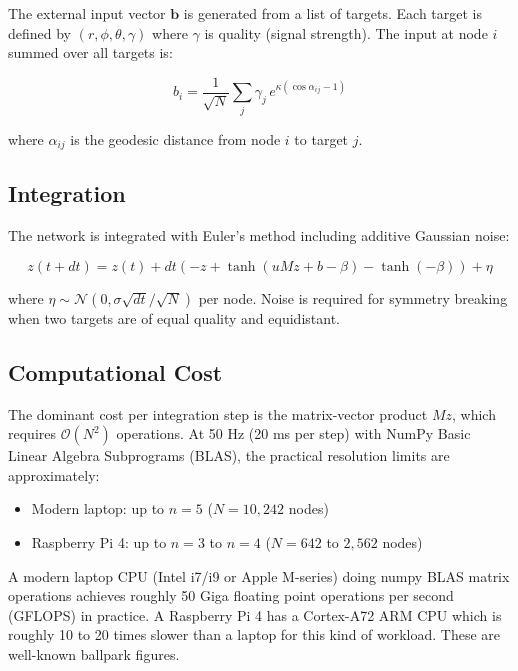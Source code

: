 \documentclass[12pt, letterpaper]{article}
\begin{document}
The external input vector $\mathbf{b}$ is generated from a list of targets. Each target is defined by $(r, \phi, \theta, \gamma)$ where $\gamma$ is quality (signal strength). The input at node $i$ summed over all targets is:

\begin{equation}
    b_i = \frac{1}{\sqrt{N}} \sum_j \gamma_j \, e^{\kappa(\cos \alpha_{ij} - 1)}
\end{equation}

where $\alpha_{ij}$ is the geodesic distance from node $i$ to target $j$.

\subsection{Integration}

The network is integrated with Euler's method including additive Gaussian noise:

\begin{equation}
    z(t + dt) = z(t) + dt \left(-z + \tanh(u M z + b - \beta) - \tanh(-\beta)\right) + \eta
\end{equation}

where $\eta \sim \mathcal{N}(0, \sigma\sqrt{dt}/\sqrt{N})$ per node. Noise is required for symmetry breaking when two targets are of equal quality and equidistant.

\subsection{Computational Cost}

The dominant cost per integration step is the matrix-vector product $Mz$, which requires $\mathcal{O}(N^2)$ operations. At 50 Hz (20 ms per step) with NumPy Basic Linear Algebra Subprograms (BLAS), the practical resolution limits are approximately:

\begin{itemize}
    \item Modern laptop: up to $n = 5$ ($N = 10{,}242$ nodes)
    \item Raspberry Pi 4: up to $n = 3$ to $n = 4$ ($N = 642$ to $2{,}562$ nodes)
\end{itemize}

A modern laptop CPU (Intel i7/i9 or Apple M-series) doing numpy BLAS matrix operations achieves roughly 50 Giga floating point operations per second (GFLOPS) in practice. A Raspberry Pi 4 has a Cortex-A72 ARM CPU which is roughly 10 to 20 times slower than a laptop for this kind of workload. These are well-known ballpark figures.
\end{document}
